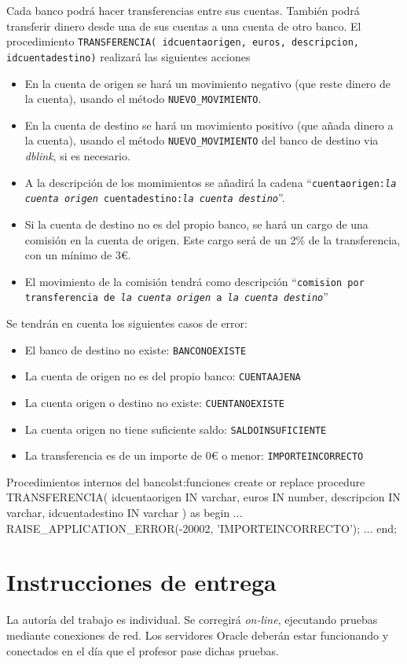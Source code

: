 \begin{homeworkProblem}
Cada banco podrá hacer transferencias entre sus cuentas. También podrá transferir dinero desde una de sus cuentas a una cuenta de otro banco. El procedimiento \texttt{TRANSFERENCIA( idcuentaorigen, euros, descripcion, idcuentadestino)} realizará las siguientes acciones
\begin{itemize}
\item En la cuenta de origen se hará un movimiento negativo (que reste dinero de la cuenta), usando el método \texttt{NUEVO\_MOVIMIENTO}.
\item En la cuenta de destino se hará un movimiento positivo (que añada dinero a la cuenta), usando el método \texttt{NUEVO\_MOVIMIENTO} del banco de destino via \textit{dblink}, si es necesario.
\item A la descripción de los momimientos se añadirá la cadena ``\texttt{cuentaorigen:\textit{la cuenta origen} cuentadestino:\textit{la cuenta destino}}''.
\item Si la cuenta de destino no es del propio banco, se hará un cargo de una comisión en la cuenta de origen. Este cargo será de un 2\% de la transferencia, con un mínimo de 3\euro.
\item El movimiento de la comisión tendrá como descripción ``\texttt{comision por transferencia de \textit{la cuenta origen} a \textit{la cuenta destino}}''  
\end{itemize}

Se tendrán en cuenta los siguientes casos de error:
\begin{itemize}
\item El banco de destino no existe: \texttt{BANCONOEXISTE}
\item La cuenta de origen no es del propio banco: \texttt{CUENTAAJENA}
\item La cuenta origen o destino no existe: \texttt{CUENTANOEXISTE}
\item La cuenta origen no tiene suficiente saldo: \texttt{SALDOINSUFICIENTE}
\item La transferencia es de un importe de 0{\euro} o menor: \texttt{IMPORTEINCORRECTO}
\end{itemize}

  \begin{listadosql}{Procedimientos internos del banco}{lst:funciones}
create or replace procedure TRANSFERENCIA(
  idcuentaorigen IN varchar, 
  euros IN number,
  descripcion IN varchar,
  idcuentadestino IN varchar )
as begin
  ...
  RAISE_APPLICATION_ERROR(-20002, 'IMPORTEINCORRECTO');
  ...
end; 

\end{listadosql}


\end{homeworkProblem}


\section{Instrucciones de entrega}
La autoría del trabajo es individual. Se corregirá \textit{on-line}, ejecutando pruebas mediante conexiones de red. Los servidores Oracle deberán estar funcionando y conectados en el día que el profesor pase dichas pruebas.








